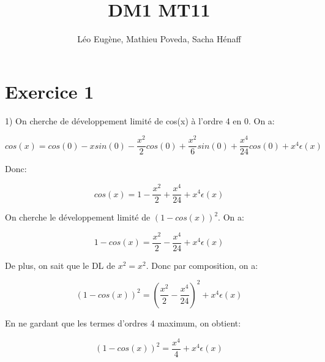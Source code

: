 \documentclass[12pt,a4paper, french]{article}
\title{DM1 MT11}
\author{Léo Eugène, Mathieu Poveda, Sacha Hénaff}
\date{}
\begin{document}
\maketitle

\section*{Exercice 1}

1) On cherche de développement limité de cos(x) à l'ordre 4 en 0. On a:
\begin{center}
    \begin{equation*}
        cos(x)=cos(0)-xsin(0)-\frac{x^2}{2}cos(0)+\frac{x^2}{6}sin(0)+\frac{x^4}{24}cos(0)+x^4\epsilon(x) 
    \end{equation*}
\end{center}

Donc:
\begin{center}
    \begin{equation*} 
        cos(x)=1-\frac{x^2}{2}+\frac{x^4}{24}+x^4\epsilon(x)
    \end{equation*}
\end{center}

On cherche le développement limité de \begin{math}
    (1-cos(x))^2
\end{math}. On a: 
\begin{center}
    \begin{equation*}
        1-cos(x)=\frac{x^2}{2}-\frac{x^4}{24}+x^4\epsilon(x)
    \end{equation*}
\end{center}

De plus, on sait que le DL de \begin{math}
    x^2=x^2
\end{math}. Donc par composition, on a:
\begin{center}
    \begin{equation*}
        (1-cos(x))^2=(\frac{x^2}{2}-\frac{x^4}{24})^2+x^4\epsilon(x)
    \end{equation*}
\end{center}

En ne gardant que les termes d'ordres 4 maximum, on obtient:

\begin{center}
    \begin{equation*}
        (1-cos(x))^2=\frac{x^4}{4}+x^4\epsilon(x)
    \end{equation*}
\end{center}
\end{document}
